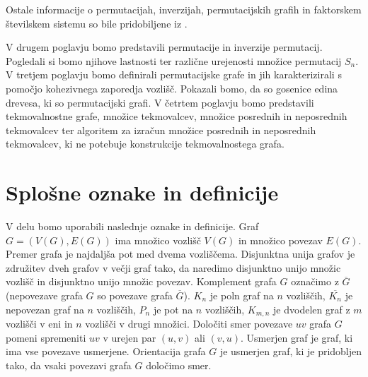 \documentclass[a4paper, 12pt]{book}
\begin{document}
Ostale informacije o permutacijah, inverzijah, permutacijskih grafih in faktorskem številskem sistemu so bile pridobiljene iz \cite{dsSkripta, inversionCoding, factorialNumberSystem}.

V drugem poglavju bomo predstavili permutacije in inverzije permutacij. Pogledali si bomo njihove lastnosti ter različne urejenosti množice permutacij $S_n$. V tretjem poglavju bomo definirali permutacijske grafe in jih karakterizirali s pomočjo kohezivnega zaporedja vozlišč. Pokazali bomo, da so gosenice edina drevesa, ki so permutacijski grafi. V četrtem poglavju bomo predstavili tekmovalnostne grafe, množice tekmovalcev, množice posrednih in neposrednih tekmovalcev ter algoritem za izračun množice posrednih in neposrednih tekmovalcev, ki ne potebuje konstrukcije tekmovalnostega grafa.



\section{ Splošne oznake in definicije }

V delu bomo uporabili naslednje oznake in definicije.
Graf $G = (V(G), E(G))$ ima množico vozlišč $V(G)$ in množico povezav $E(G)$. Premer grafa je najdaljša pot med dvema vozliščema. Disjunktna unija grafov je združitev dveh grafov v večji graf tako, da naredimo disjunktno unijo množic vozlišč in disjunktno unijo množic povezav. Komplement grafa $G$ označimo z $\overline{G}$ (nepovezave grafa $G$ so povezave grafa $\overline{G}$). $K_n$ je poln graf na $n$ vozliščih, $\overline{K_n}$ je nepovezan graf na $n$ vozliščih, $P_n$ je pot na $n$ vozliščih, $K_{m, n}$ je dvodelen graf z $m$ vozlišči v eni in $n$ vozlišči v drugi množici. Določiti smer povezave $uv$ grafa $G$ pomeni spremeniti $uv$ v urejen par $(u, v)$ ali $(v, u)$. Usmerjen graf je graf, ki ima vse povezave usmerjene. Orientacija grafa $G$ je usmerjen graf, ki je pridobljen tako, da vsaki povezavi grafa $G$ določimo smer.
\end{document}

